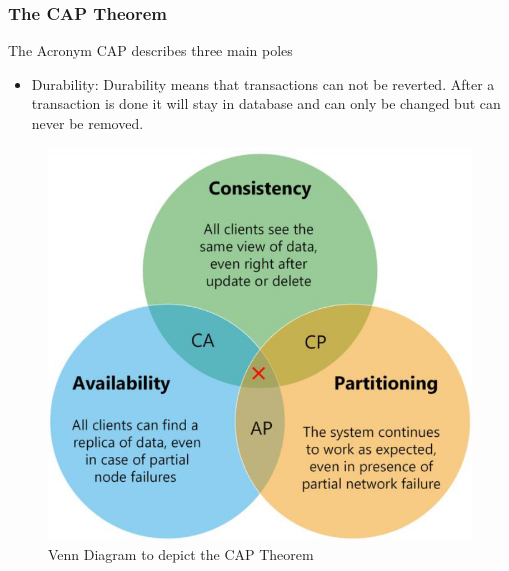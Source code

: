 \subsubsection{The CAP Theorem}
The Acronym CAP describes three main poles 
\begin{itemize}
    \item Durability: Durability means that transactions can not be reverted. After a transaction is done it will stay in database and can only be changed but can never be removed.
\end{itemize}
\begin{figure}[h]
    \centering
    \includegraphics[width=0.4\linewidth]{images/CAP_Theorem.png}
    \caption{Venn Diagram to depict the CAP Theorem}
    \label{fig:FirstIteration-general}
    \end{figure}